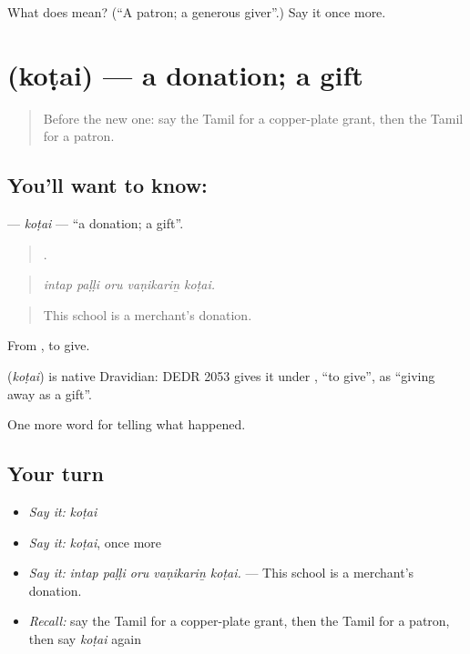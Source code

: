 \begin{tcolorbox}[breakable,colback=teal!4,colframe=teal!35!black,title={Before you move on}]
What does  mean? (\textquotedblleft{}A patron; a generous giver\textquotedblright{}.) Say it once more.
\end{tcolorbox}
\section[\texorpdfstring{\ta{கொடை} (koṭai)}{கொடை (koṭai)}]{ (koṭai) — a donation; a gift}

\label{lesson:TA-C331-kotai}



\begin{quote}
Before the new one: say the Tamil for a copper-plate grant, then the Tamil for a patron.
\end{quote}

\subsection*{You'll want to know: }
\textbf{} — \emph{koṭai} — \textquotedblleft{}a donation; a gift\textquotedblright{}.

\begin{quote}
    .
\end{quote}

\begin{quote}
\emph{intap paḷḷi oru vaṇikariṉ koṭai.}
\end{quote}

\begin{quote}
This school is a merchant's donation.
\end{quote}

From , to give.

\begin{cousinweb}
\textbf{} (\emph{koṭai}) is native Dravidian: DEDR 2053 gives it under , \textquotedblleft{}to give\textquotedblright{}, as \textquotedblleft{}giving away as a gift\textquotedblright{}.
\end{cousinweb}

\begin{grammarlens}[title={What you've built}]
One more word for telling what happened.
\end{grammarlens}

\subsection*{Your turn}
\begin{itemize}
\raggedright
  \item \emph{Say it:} \emph{koṭai}
  \item \emph{Say it:} \emph{koṭai}, once more
  \item \emph{Say it:} \emph{intap paḷḷi oru vaṇikariṉ koṭai.} — This school is a merchant's donation.
  \item \emph{Recall:} say the Tamil for a copper-plate grant, then the Tamil for a patron, then say \emph{koṭai} again
\end{itemize}

